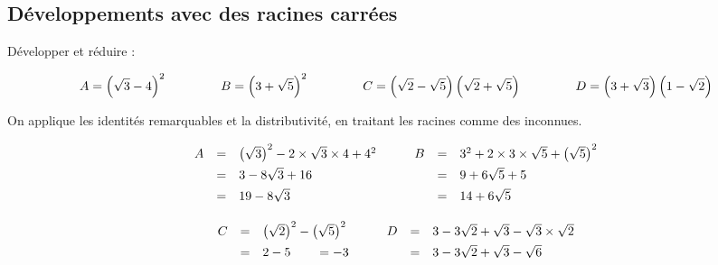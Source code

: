 \subsection{Développements avec des racines carrées}

\begin{methode}
	Développer et réduire :

	\[
		A = \left( \sqrt{3} - 4 \right)^2 \hspace{1.5cm} B = \left( 3 + \sqrt{5} \right)^2 \hspace{1.5cm} C = \left( \sqrt{2} - \sqrt{5} \right)\left( \sqrt{2} + \sqrt{5} \right) \hspace{1.5cm} D = \left( 3 + \sqrt{3} \right)\left( 1 - \sqrt{2} \right)
	\]

	\begin{correction}
		On applique les identités remarquables et la distributivité, en traitant les racines comme des inconnues.

		\[
			\def\arraystretch{1.4} \begin{array}{rcl}
				A & = & \left( \sqrt{3} \right)^2 - 2 \times \sqrt{3} \times 4 + 4^2 \\
				  & = & 3 - 8\sqrt{3} + 16                                           \\
				  & = & 19 - 8\sqrt{3}
			\end{array} \qquad \def\arraystretch{1.4} \begin{array}{rcl}
				B & = & 3^2 + 2 \times 3 \times \sqrt{5} + \left( \sqrt{5} \right)^2 \\
				  & = & 9 + 6\sqrt{5} + 5                                            \\
				  & = & 14 + 6\sqrt{5}
			\end{array}
		\]

		\ms

		\[
			\def\arraystretch{1.4} \begin{array}{rcl}
				C & = & \left( \sqrt{2} \right)^2 - \left( \sqrt{5} \right)^2 \\
				  & = & 2 - 5 \qquad = -3
			\end{array} \qquad \def\arraystretch{1.4} \begin{array}{rcl}
				D & = & 3 - 3\sqrt{2} + \sqrt{3} - \sqrt{3} \times \sqrt{2} \\
				  & = & 3 - 3\sqrt{2} + \sqrt{3} - \sqrt{6}
			\end{array}
		\]

	\end{correction}
\end{methode}
